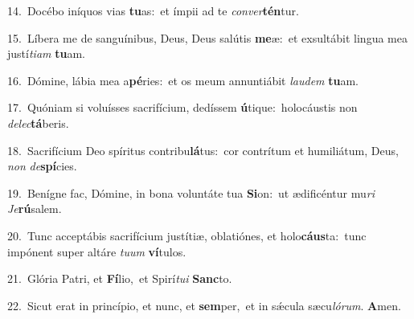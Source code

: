 {\numbfont\textcolor{\numbcolor}{14.}}~Docébo iníquos vias \textbf{tu}\-as:~\star et ímpii ad te \textit{con}\-\textit{ver}\textbf{tén}tur.\par
{\numbfont\textcolor{\numbcolor}{15.}}~Líbera me de sanguínibus, Deus, Deus salútis \textbf{me}\-æ:~\star et exsultábit lingua mea justí\-\textit{ti}\-\textit{am} \textbf{tu}\-am.\par
{\numbfont\textcolor{\numbcolor}{16.}}~Dómine, lábia mea a\-\textbf{pé}\-ries:~\star et os meum annuntiábit \textit{lau}\-\textit{dem} \textbf{tu}\-am.\par
{\numbfont\textcolor{\numbcolor}{17.}}~Quóniam si voluísses sacrifícium, dedíssem \textbf{ú}\-tique:~\star holocáustis non \textit{de}\-\textit{lec}\textbf{tá}beris.\par
{\numbfont\textcolor{\numbcolor}{18.}}~Sacrifícium Deo spíritus contribu\-\textbf{lá}\-tus:~\star cor contrítum et humiliátum, Deus, \textit{non} \textit{de}\-\textbf{spí}cies.\par
{\numbfont\textcolor{\numbcolor}{19.}}~Benígne fac, Dómine, in bona voluntáte tua \textbf{Si}\-on:~\star ut ædificéntur mu\textit{ri} \textit{Je}\-\textbf{rú}salem.\par
{\numbfont\textcolor{\numbcolor}{20.}}~Tunc acceptábis sacrifícium justítiæ, oblatiónes, et holo\-\textbf{cáus}\-ta:~\star tunc impónent super altáre \textit{tu}\-\textit{um} \textbf{ví}\-tulos.\par
{\numbfont\textcolor{\numbcolor}{21.}}~Glória Patri, et \textbf{Fí}\-lio,~\star et Spirí\-\textit{tu}\-\textit{i} \textbf{Sanc}\-to.\par
{\numbfont\textcolor{\numbcolor}{22.}}~Sicut erat in princípio, et nunc, et \textbf{sem}\-per,~\star et in sǽcula sæcu\-\textit{ló}\-\textit{rum}. \textbf{A}\-men.\par
